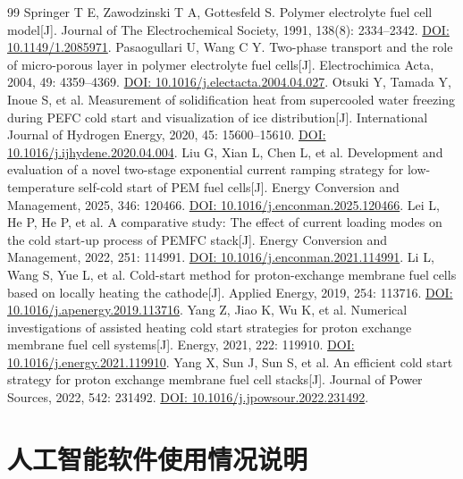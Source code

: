 \documentclass[bwprint]{gmcmthesis}
\numberwithin{equation}{section}
\numberwithin{figure}{section}
\begin{document}
\begin{thebibliography}{99}
 Springer T E, Zawodzinski T A, Gottesfeld S. Polymer electrolyte fuel cell model[J]. Journal of The Electrochemical Society, 1991, 138(8): 2334--2342. \href{https://doi.org/10.1149/1.2085971}{DOI: 10.1149/1.2085971}.
 Pasaogullari U, Wang C Y. Two-phase transport and the role of micro-porous layer in polymer electrolyte fuel cells[J]. Electrochimica Acta, 2004, 49: 4359--4369. \href{https://doi.org/10.1016/j.electacta.2004.04.027}{DOI: 10.1016/j.electacta.2004.04.027}.
 Otsuki Y, Tamada Y, Inoue S, et al. Measurement of solidification heat from supercooled water freezing during PEFC cold start and visualization of ice distribution[J]. International Journal of Hydrogen Energy, 2020, 45: 15600--15610. \href{https://doi.org/10.1016/j.ijhydene.2020.04.004}{DOI: 10.1016/j.ijhydene.2020.04.004}.
 Liu G, Xian L, Chen L, et al. Development and evaluation of a novel two-stage exponential current ramping strategy for low-temperature self-cold start of PEM fuel cells[J]. Energy Conversion and Management, 2025, 346: 120466. \href{https://doi.org/10.1016/j.enconman.2025.120466}{DOI: 10.1016/j.enconman.2025.120466}.
 Lei L, He P, He P, et al. A comparative study: The effect of current loading modes on the cold start-up process of PEMFC stack[J]. Energy Conversion and Management, 2022, 251: 114991. \href{https://doi.org/10.1016/j.enconman.2021.114991}{DOI: 10.1016/j.enconman.2021.114991}.
 Li L, Wang S, Yue L, et al. Cold-start method for proton-exchange membrane fuel cells based on locally heating the cathode[J]. Applied Energy, 2019, 254: 113716. \href{https://doi.org/10.1016/j.apenergy.2019.113716}{DOI: 10.1016/j.apenergy.2019.113716}.
 Yang Z, Jiao K, Wu K, et al. Numerical investigations of assisted heating cold start strategies for proton exchange membrane fuel cell systems[J]. Energy, 2021, 222: 119910. \href{https://doi.org/10.1016/j.energy.2021.119910}{DOI: 10.1016/j.energy.2021.119910}.
 Yang X, Sun J, Sun S, et al. An efficient cold start strategy for proton exchange membrane fuel cell stacks[J]. Journal of Power Sources, 2022, 542: 231492. \href{https://doi.org/10.1016/j.jpowsour.2022.231492}{DOI: 10.1016/j.jpowsour.2022.231492}.
\end{thebibliography}

\appendix
\renewcommand{\theHsection}{appendix.\Alph{section}}
\section{人工智能软件使用情况说明}
\end{document}
